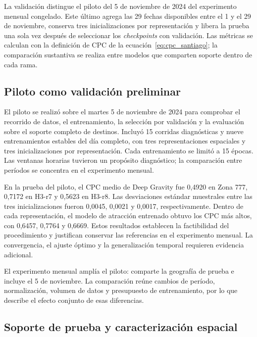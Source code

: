 \label{sec:cap5}

La validación distingue el piloto del 5 de noviembre de 2024 del experimento mensual congelado. Este último agrega las 29 fechas disponibles entre el 1 y el 29 de noviembre, conserva tres inicializaciones por representación y libera la prueba una sola vez después de seleccionar los \textit{checkpoints} con validación. Las métricas se calculan con la definición de CPC de la ecuación~\eqref{eq:cpc_santiago}; la comparación sustantiva se realiza entre modelos que comparten soporte dentro de cada rama.

\subsection{Piloto como validación preliminar}
\label{sec:piloto_preliminar}

El piloto se realizó sobre el martes 5 de noviembre de 2024 para comprobar el recorrido de datos, el entrenamiento, la selección por validación y la evaluación sobre el soporte completo de destinos. Incluyó 15 corridas diagnósticas y nueve entrenamientos estables del día completo, con tres representaciones espaciales y tres inicializaciones por representación. Cada entrenamiento se limitó a 15 épocas. Las ventanas horarias tuvieron un propósito diagnóstico; la comparación entre períodos se concentra en el experimento mensual.

En la prueba del piloto, el CPC medio de Deep Gravity fue 0,4920 en Zona 777, 0,7172 en H3-r7 y 0,5623 en H3-r8. Las desviaciones estándar muestrales entre las tres inicializaciones fueron 0,0045, 0,0021 y 0,0017, respectivamente. Dentro de cada representación, el modelo de atracción entrenado obtuvo los CPC más altos, con 0,6457, 0,7764 y 0,6669. Estos resultados establecen la factibilidad del procedimiento y justifican conservar las referencias en el experimento mensual. La convergencia, el ajuste óptimo y la generalización temporal requieren evidencia adicional.

El experimento mensual amplía el piloto: comparte la geografía de prueba e incluye el 5 de noviembre. La comparación reúne cambios de período, normalización, volumen de datos y presupuesto de entrenamiento, por lo que describe el efecto conjunto de esas diferencias.

\subsection{Soporte de prueba y caracterización espacial}
\label{sec:soporte_prueba}

